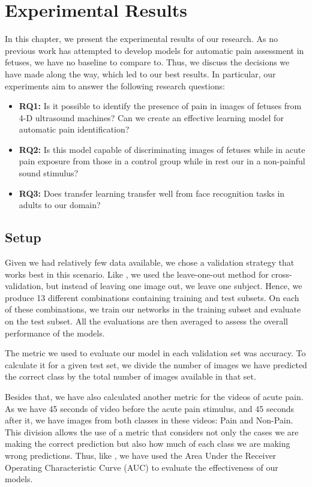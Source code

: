 \chapter{Experimental Results}

In this chapter, we present the experimental results of our research. As no previous work has attempted to develop models for automatic pain assessment in fetuses, we have no baseline to compare to. Thus, we discuss the decisions we have made along the way, which led to our best results. In particular, our experiments aim to answer the following research questions:

\begin{itemize}
    \item \textbf{RQ1:} Is it possible to identify the presence of pain in images of fetuses from 4-D ultrasound machines? Can we create an effective learning model for automatic pain identification?
    
    \item \textbf{RQ2:} Is this model capable of discriminating images of fetuses while in acute pain exposure from those in a control group while in rest our in a non-painful sound stimulus?
    
    \item \textbf{RQ3:} Does transfer learning transfer well from face recognition tasks in adults to our domain?
\end{itemize}

\section{Setup}

Given we had relatively few data available, we chose a validation strategy that works best in this scenario. Like \cite{CelonaM17}, we used the leave-one-out method for cross-validation, but instead of leaving one image out, we leave one subject. Hence, we produce 13 different combinations containing training and test subsets. On each of these combinations, we train our networks in the training subset and evaluate on the test subset. All the evaluations are then averaged to assess the overall performance of the models.

The metric we used to evaluate our model in each validation set was accuracy. To calculate it for a given test set, we divide the number of images we have predicted the correct class by the total number of images available in that set.

Besides that, we have also calculated another metric for the videos of acute pain. As we have 45 seconds of video before the acute pain stimulus, and 45 seconds after it, we have images from both classes in these videos: Pain and Non-Pain.  This division allows the use of a metric that considers not only the cases we are making the correct prediction but also how much of each class we are making wrong predictions. Thus, like \cite{abs-1807-01631}, we have used the Area Under the Receiver Operating Characteristic Curve (AUC) to evaluate the effectiveness of our models.

